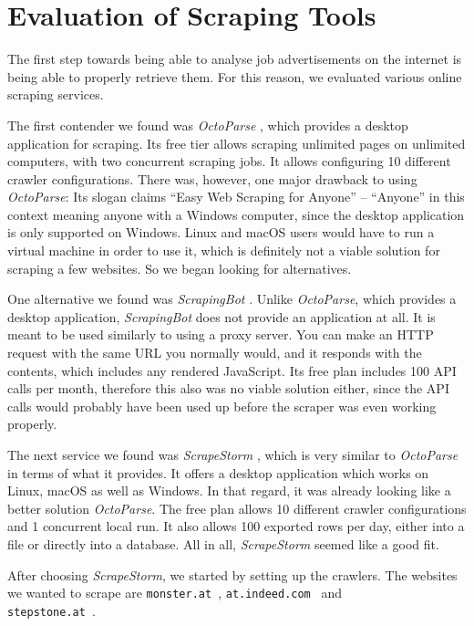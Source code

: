 \documentclass[runningheads]{llncs}
\begin{document}
\section{Evaluation of Scraping Tools}
\label{sec:evaluation_of_scraping_tools}

The first step towards being able to analyse job advertisements on the internet is being able to properly retrieve them. For this reason, we evaluated various online scraping services.

The first contender we found was \textit{OctoParse} \cite{octoparse}, which provides a desktop application for scraping. Its free tier allows scraping unlimited pages on unlimited computers, with two concurrent scraping jobs. It allows configuring 10 different crawler configurations. There was, however, one major drawback to using \textit{OctoParse}: Its slogan claims “Easy Web Scraping for Anyone” – “Anyone” in this context meaning anyone with a Windows computer, since the desktop application is only supported on Windows. Linux and macOS users would have to run a virtual machine in order to use it, which is definitely not a viable solution for scraping a few websites. So we began looking for alternatives.

One alternative we found was \textit{ScrapingBot} \cite{scrapingbot}. Unlike \textit{OctoParse}, which provides a desktop application, \textit{ScrapingBot} does not provide an application at all. It is meant to be used similarly to using a proxy server. You can make an HTTP request with the same URL you normally would, and it responds with the contents, which includes any rendered JavaScript. Its free plan includes 100 API calls per month, therefore this also was no viable solution either, since the API calls would probably have been used up before the scraper was even working properly.

The next service we found was \textit{ScrapeStorm} \cite{scrapestorm}, which is very similar to \textit{OctoParse} in terms of what it provides. It offers a desktop application which works on Linux, macOS as well as Windows. In that regard, it was already looking like a better solution \textit{OctoParse}. The free plan allows 10 different crawler configurations and 1 concurrent local run. It also allows 100 exported rows per day, either into a file or directly into a database. All in all, \textit{ScrapeStorm} seemed like a good fit.

After choosing \textit{ScrapeStorm}, we started by setting up the crawlers. The websites we wanted to scrape are \texttt{monster.at}~\cite{monster}, \texttt{at.indeed.com}~\cite{indeed} and \\ \texttt{stepstone.at}~\cite{stepstone}.
\end{document}
